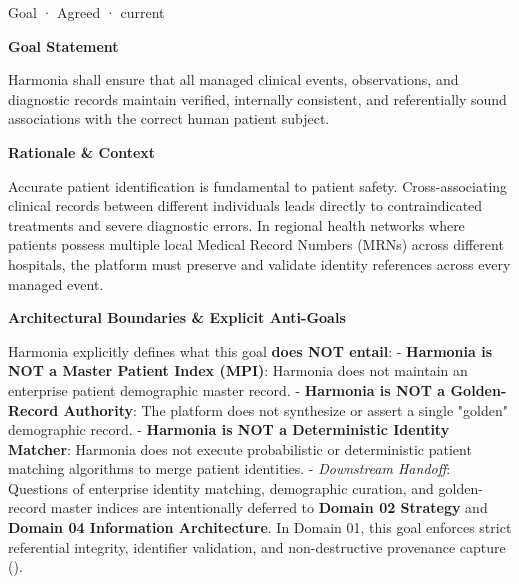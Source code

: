 \label{element:e2f8b62e2cbd486282d68b6009c06de6}
{\small Goal · Agreed · current}\par

\par\medskip\textbf{Goal Statement}\par


Harmonia shall ensure that all managed clinical events, observations, and diagnostic records maintain verified, internally consistent, and referentially sound associations with the correct human patient subject.



\par\medskip\textbf{Rationale \& Context}\par


Accurate patient identification is fundamental to patient safety. Cross-associating clinical records between different individuals leads directly to contraindicated treatments and severe diagnostic errors. In regional health networks where patients possess multiple local Medical Record Numbers (MRNs) across different hospitals, the platform must preserve and validate identity references across every managed event.



\par\medskip\textbf{Architectural Boundaries \& Explicit Anti-Goals}\par


Harmonia explicitly defines what this goal \textbf{does NOT entail}:
- \textbf{Harmonia is NOT a Master Patient Index (MPI)}: Harmonia does not maintain an enterprise patient demographic master record.
- \textbf{Harmonia is NOT a Golden-Record Authority}: The platform does not synthesize or assert a single "golden" demographic record.
- \textbf{Harmonia is NOT a Deterministic Identity Matcher}: Harmonia does not execute probabilistic or deterministic patient matching algorithms to merge patient identities.
- \emph{Downstream Handoff}: Questions of enterprise identity matching, demographic curation, and golden-record master indices are intentionally deferred to \textbf{Domain 02 Strategy} and \textbf{Domain 04 Information Architecture}. In Domain 01, this goal enforces strict referential integrity, identifier validation, and non-destructive provenance capture (\href{\detokenize{../../../../../docs/markdown/01-motivation/requirements-constraints/foundational-requirements.md}}{\texttt{}}).


